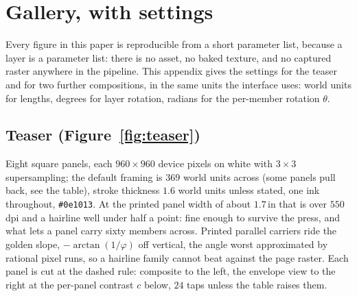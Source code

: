 \section{Gallery, with settings}
\label{app:gallery}

Every figure in this paper is reproducible from a short parameter list, because a
layer is a parameter list: there is no asset, no baked texture, and no captured
raster anywhere in the pipeline. This appendix gives the settings for the teaser and
for two further compositions, in the same units the interface uses: world units for
lengths, degrees for layer rotation, radians for the per-member rotation
$\theta$.

\subsection{Teaser (Figure~\ref{fig:teaser})}

Eight square panels, each $960\times960$ device pixels on white with $3\times3$
supersampling; the default framing is $369$ world units across (some panels pull
back, see the table), stroke thickness $1.6$ world units unless stated, one ink
throughout, \texttt{\#0e1013}. At the printed panel width of about $1.7$\,in
that is over $550$\,dpi and a hairline well under half a point: fine enough to
survive the press, and what lets a panel carry sixty members across. Printed
parallel carriers ride the golden slope, $-\arctan(1/\varphi)$ off vertical,
the angle worst approximated by rational pixel runs, so a hairline family
cannot beat against the page raster. Each panel
is cut at the dashed rule: composite to the left, the envelope view to the
right at the per-panel contrast $c$ below, $24$ taps unless the table raises
them.

